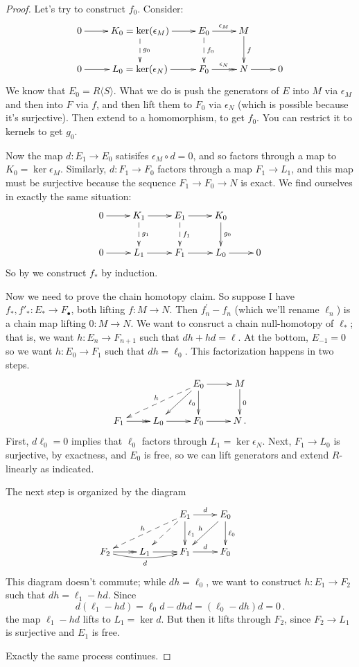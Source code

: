 \begin{proof} Let's try to construct $f_0$. Consider:
\begin{equation*}
\xymatrix{0\ar[r] & K_0=\ker(\epsilon_M)\ar[r]\ar@{-->}[d]^{g_0} & E_0\ar[r]^{\epsilon_M}\ar@{-->}[d]^{f_0} & M\ar[d]^f &\\
0\ar[r] & L_0=\ker(\epsilon_N)\ar[r] & F_0\ar@{->>}[r]^{\epsilon_N} & N\ar[r] & 0}
\end{equation*}
We know that $E_0=R\langle S\rangle$. What we do is push the generators of $E$ into $M$ via $\epsilon_M$ and then into $F$ via $f$, and then lift them to $F_0$ via  $\epsilon_N$ (which is possible because it's surjective). Then extend to
a homomorphism, to get $f_0$. You can restrict it to kernels to get $g_0$. 

Now the map $d:E_1\to E_0$ satisifes $\epsilon_M\circ d=0$, and so factors through a map to $K_0=\ker\epsilon_M$. Similarly, $d:F_1\to F_0$ factors through 
a map $F_1\to L_1$, and this map must be surjective because the sequence
$F_1\to F_0\to N$ is exact. We find ourselves in exactly the same situation:
\begin{equation*}
\xymatrix{0\ar[r] & K_1\ar[r]\ar@{-->}[d]^{g_1} & E_1\ar[r]\ar@{-->}[d]^{f_1} & K_0\ar[d]^{g_0} &\\
0\ar[r] & L_1\ar[r] & F_1\ar[r] & L_0\ar[r] & 0}
\end{equation*}
So by we construct $f_*$ by induction.

Now we need to prove the chain homotopy claim. So suppose I have $f_\ast,f'_\ast:E_\ast\to F_\bullet$, both lifting $f:M\to N$. Then $f^\prime_n-f_n$ (which we'll rename $\ell_n$) is a chain map lifting $0:M\to N$. 
We want to consruct a chain null-homotopy of $\ell_\ast$; that is, we want $h:E_n\to F_{n+1}$ such that $dh+hd=\ell$. At the bottom, $E_{-1}=0$ so we want
$h:E_0\to F_1$ such that $dh=\ell_0$. This factorization happens in two steps. 
\begin{equation*}
\xymatrix{ & & E_0\ar[d]_{\ell_0}\ar[dl]\ar@{-->}[dll]_h \ar[r] & M\ar[d]^0 \\
F_1\ar@{->>}[r] & L_0\ar[r] & F_0 \ar[r] & N \,.
}\end{equation*}
First, $d\ell_0=0$ implies that $\ell_0$ factors through $L_1=\ker\epsilon_N$.
Next, $F_1\to L_0$ is surjective, by exactness, and $E_0$ is free, so we can lift generators and extend $R$-linearly as indicated. 

The next step is organized by the diagram
\begin{equation*}
\xymatrix{ & & E_1\ar[r]^d\ar[d]^{\ell_1}\ar@{-->}[dl]\ar@{-->}[dll]_h & 
E_0\ar[d]^{\ell_0}\ar[dl]_h & \\
F_2\ar@{->>}[r]\ar@/_/[rr]_d & L_1\ar[r] & F_1\ar[r]^d & F_0}
\end{equation*}
This diagram doesn't commute; while $dh=\ell_0$, we want to construct 
$h:E_1\to F_2$ such that $dh=\ell_1-hd$. Since 
\[
d(\ell_1-hd)=\ell_0d-dhd=(\ell_0-dh)d=0\,.
\]
the map $\ell_1-hd$ lifts to $L_1=\ker d$. But then it lifts through $F_2$, 
since $F_2\to L_1$ is surjective and $E_1$ is free. 

Exactly the same process continues.
\end{proof}

